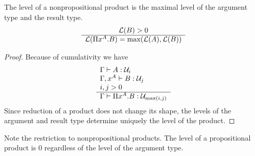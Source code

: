 \begin{theorem}
    \label{thm:LevelProduct}
    The level of a nonpropositional product is the maximal level of the argument
    type and the result type.
    $$
    \begin{array}{c} 
        {\cal L}(B) > 0
     \\ \hline 
        {\cal L}(\Pi x^A.B) = {\text{max}}({\cal L}(A), {\cal L}(B))
    \end{array}
    $$
    \begin{proof}
        Because of cumulativity we have
        $$
        \begin{array}{l} 
            \Gamma \vdash A: {\cal U}_i
            \\
            \Gamma,x^A \vdash B: {\cal U}_j
            \\
            i,j > 0
         \\ \hline 
            \Gamma \vdash \Pi x^A. B : {\cal U}_{{\text{max}}(i,j)}
        \end{array}
        $$
        Since reduction of a product does not change its shape, the levels of
        the argument and result type determine uniquely the level of the
        product.
    \end{proof}

    Note the restriction to nonpropositional products. The level of a
    propositional product is 0 regardless of the level of the argument type.
\end{theorem}




